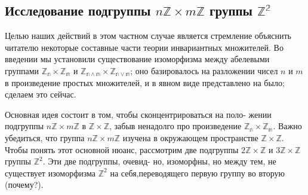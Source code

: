 \documentclass{mai_book}
\begin{document}
\subsection{Исследование подгруппы $n\mathbb{Z} \times m\mathbb{Z}$ группы $\mathbb{Z^2}$}
\noindent Целью наших действий в этом частном случае является стремление \linebreak объяснить читателю некоторые составные части теории инвариантных \linebreak множителей. Во введении мы установили существование изоморфизма \linebreak между абелевыми группами $\mathbb{Z_n} \times \mathbb{Z_m}$ и $\mathbb{Z_{n \wedge m}} \times \mathbb{Z_{n \vee m}}$; оно базировалось \linebreak на разложении чисел $n$ и $m$ в произведение простых множителей, и в \linebreak явном виде представлено на было; сделаем это сейчас.
  
Основная идея состоит в том, чтобы сконцентрироваться на поло- \linebreak жении подгруппы $n\mathbb{Z} \times m\mathbb{Z}$ в $\mathbb{Z} \times \mathbb{Z}$, забыв ненадолго про произведение \linebreak $\mathbb{Z_n} \times \mathbb{Z_m}$. Важно убедиться, что группа $n\mathbb{Z} \times m\mathbb{Z}$ изучена в окружающем \linebreak пространстве $\mathbb{Z}\times \mathbb{Z}$. Чтобы понять этот основной нюанс, рассмотрим \linebreak две подгруппы $2\mathbb{Z} \times \mathbb{Z}$ и $3\mathbb{Z} \times \mathbb{Z}$ группы $\mathbb{Z}^2$. Эти две подгруппы, очевид- \linebreak но, изоморфны, но между тем, не существует изоморфизма $\mathbb{Z}^2$ на себя,\linebreak переводящего первую группу во вторую (почему?).
  
\end{document}
